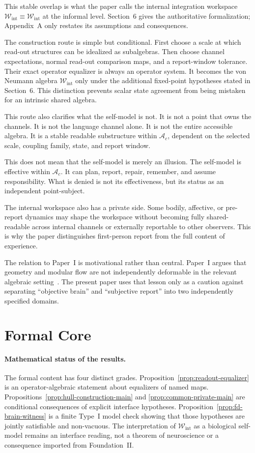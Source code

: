 \documentclass[12pt]{article}
\theoremstyle{definition}
\theoremstyle{remark}
\newcommand{\Ac}{\mathcal A_c}
\newcommand{\Wint}{\mathcal W_{\mathrm{int}}}
\newcommand{\Bint}{\Wint}
\begin{document}
This stable overlap is what the paper calls the internal integration
workspace \(\Bint\equiv\Wint\) at the informal level. Section~6 gives
the authoritative formalization; Appendix~A only restates its assumptions
and consequences.

The construction route is simple but conditional. First choose a scale
at which read-out structures can be idealized as subalgebras. Then
choose channel expectations, normal read-out comparison maps, and a
report-window tolerance. Their exact operator equalizer is always an
operator system. It becomes the von Neumann algebra \(\Wint\) only under
the additional fixed-point hypotheses stated in Section~6. This
distinction prevents scalar state agreement from being mistaken for an
intrinsic shared algebra.

This route also clarifies what the self-model is not. It is not a point
that owns the channels. It is not the language channel alone. It is not
the entire accessible algebra. It is a stable readable substructure
within \(\Ac\), dependent on the selected scale, coupling family, state,
and report window.

This does not mean that the self-model is merely an illusion. The
self-model is effective within \(\Ac\). It can plan, report, repair,
remember, and assume responsibility. What is denied is not its
effectiveness, but its status as an independent point-subject.

The internal workspace also has a private side. Some bodily, affective, or
pre-report dynamics may shape the workspace without becoming fully
shared-readable across internal channels or externally reportable to
other observers. This is why the paper distinguishes first-person
report from the full content of experience.

The relation to Paper~I is motivational rather than central. Paper~I
argues that geometry and modular flow are not independently deformable
in the relevant algebraic setting~\cite{PaperI}. The present paper uses
that lesson only as a caution against separating ``objective brain'' and
``subjective report'' into two independently specified domains.

\section{Formal Core}

\paragraph{Mathematical status of the results.}
The formal content has four distinct grades. Proposition~\ref{prop:readout-equalizer}
is an operator-algebraic statement about equalizers of named maps.
Propositions~\ref{prop:hull-construction-main} and
\ref{prop:common-private-main} are conditional consequences of explicit
interface hypotheses. Proposition~\ref{prop:fd-brain-witness} is a
finite Type~I model check showing that those hypotheses are jointly
satisfiable and non-vacuous. The interpretation of \(\Wint\) as a
biological self-model remains an interface reading, not a theorem of
neuroscience or a consequence imported from Foundation~II.
\end{document}
